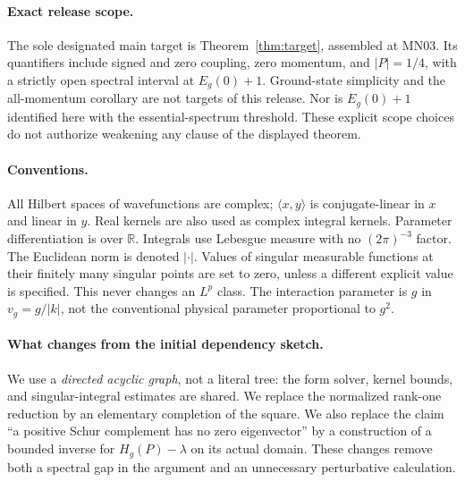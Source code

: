 \documentclass[11pt,a4paper]{article}
\theoremstyle{remark}\newtheorem{remark}[theorem]{Remark}
\newcommand{\R}{\mathbb R}\newcommand{\C}{\mathbb C}\newcommand{\N}{\mathbb N}
\newcommand{\ip}[2]{\langle #1,#2\rangle}\newcommand{\norm}[1]{\lVert #1\rVert}
\newcommand{\abs}[1]{\lvert #1\rvert}\newcommand{\rankone}[2]{\lvert #1\rangle\langle #2\rvert}
\begin{document}
\paragraph{Exact release scope.}
The sole designated main target is Theorem~\ref{thm:target}, assembled at MN03. Its quantifiers include signed and zero coupling, zero momentum, and $|P|=1/4$, with a strictly open spectral interval at $E_g(0)+1$. Ground-state simplicity and the all-momentum corollary are not targets of this release. Nor is $E_g(0)+1$ identified here with the essential-spectrum threshold. These explicit scope choices do not authorize weakening any clause of the displayed theorem.

\paragraph{Conventions.}
All Hilbert spaces of wavefunctions are complex; $\ip{x}{y}$ is conjugate-linear in $x$ and linear in $y$. Real kernels are also used as complex integral kernels. Parameter differentiation is over $\R$. Integrals use Lebesgue measure with no $(2\pi)^{-3}$ factor. The Euclidean norm is denoted $\abs\cdot$. Values of singular measurable functions at their finitely many singular points are set to zero, unless a different explicit value is specified. This never changes an $L^p$ class. The interaction parameter is $g$ in $v_g=g/\abs k$, not the conventional physical parameter proportional to $g^2$.

\paragraph{What changes from the initial dependency sketch.}
We use a \emph{directed acyclic graph}, not a literal tree: the form solver, kernel bounds, and singular-integral estimates are shared. We replace the normalized rank-one reduction by an elementary completion of the square. We also replace the claim ``a positive Schur complement has no zero eigenvector'' by a construction of a bounded inverse for $H_g(P)-\lambda$ on its actual domain. These changes remove both a spectral gap in the argument and an unnecessary perturbative calculation.
\end{document}
